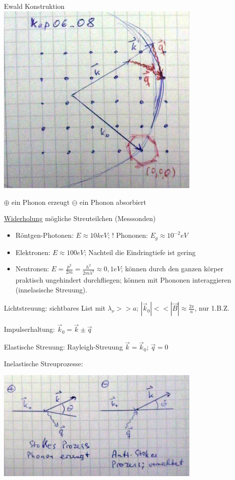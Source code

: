 Ewald Konstruktion
\includegraphics[width=0.75\textwidth]{kap06_08.png}

\(\oplus\) ein Phonon erzeugt
\(\ominus\) ein Phonon absorbiert

\underline{Widerholung} mögliche Streuteilchen (Messsonden)

\begin{itemize}
\item Röntgen-Photonen: \(E\approx 10keV\); ! Phononen: \(E_g\approx 10^{-2}eV\)
\item Elektronen: \(E\approx 100eV\); Nachteil die Eindringtiefe ist gering
\item Neutronen: \(E=\frac{p^2}{2m}=\frac{h^2}{2m\lambda^2} \approx 0,1eV\); können durch den ganzen körper praktisch ungehindert durchfliegen; können mit Phononen interaggieren (innelasische Streuung). 
\end{itemize}

Lichtstreuung: sichtbares List mit \(\lambda_\nu >> a\); \(|\vec k_0|<<|\vec B|\approx \frac{2\pi}{a}\), nur 1.B.Z.

Impulserhaltung: \(\vec k_0=\vec k \pm \vec q\)

Elastische Streuung: Rayleigh-Streuung \(\vec k=\vec k_0\); \(\vec q=0\)

Inelastische Streuprozesse:

\includegraphics[width=0.75\textwidth]{kap06_09.png}

